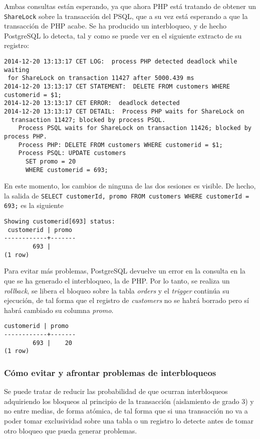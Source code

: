 \documentclass{article}
\begin{document}
Ambas consultas están esperando, ya que ahora PHP está tratando de obtener un \texttt{ShareLock} sobre la transacción del PSQL, que a su vez está esperando a que la transacción de PHP acabe. Se ha producido un interbloqueo, y de hecho PostgreSQL lo detecta, tal y como se puede ver en el siguiente extracto de su registro:

\begin{Verbatim}[frame = lines]
2014-12-20 13:13:17 CET LOG:  process PHP detected deadlock while waiting
 for ShareLock on transaction 11427 after 5000.439 ms
2014-12-20 13:13:17 CET STATEMENT:  DELETE FROM customers WHERE customerid = $1;
2014-12-20 13:13:17 CET ERROR:  deadlock detected
2014-12-20 13:13:17 CET DETAIL:  Process PHP waits for ShareLock on
  transaction 11427; blocked by process PSQL.
    Process PSQL waits for ShareLock on transaction 11426; blocked by process PHP.
    Process PHP: DELETE FROM customers WHERE customerid = $1;
    Process PSQL: UPDATE customers
      SET promo = 20
      WHERE customerid = 693;
\end{Verbatim}

En este momento, los cambios de ninguna de las dos sesiones es visible. De hecho, la salida de \texttt{SELECT customerId, promo FROM customers WHERE customerId = 693;} es la siguiente

\begin{Verbatim}[frame = lines]
Showing customerid[693] status:
 customerid | promo
------------+-------
        693 |
(1 row)
\end{Verbatim}

Para evitar más problemas, PostgreSQL devuelve un error en la consulta en la que se ha generado el interbloqueo, la de PHP. Por lo tanto, se realiza un \textit{rollback}, se libera el bloqueo sobre la tabla \textit{orders} y el \textit{trigger} continúa su ejecución, de tal forma que el registro de \textit{customers} no se habrá borrado pero sí habrá cambiado su columna \textit{promo}.

\begin{Verbatim}[frame=lines]
 customerid | promo
------------+-------
        693 |    20
(1 row)
\end{Verbatim}

\subsubsection{Cómo evitar y afrontar problemas de interbloqueos}

Se puede tratar de reducir las probabilidad de que ocurran interbloqueos adquiriendo los bloqueos al principio de la transacción (aislamiento de grado 3) y no entre medias, de forma atómica, de tal forma que si una transacción no va a poder tomar exclusividad sobre una tabla o un registro lo detecte antes de tomar otro bloqueo que pueda generar problemas.
\end{document}
